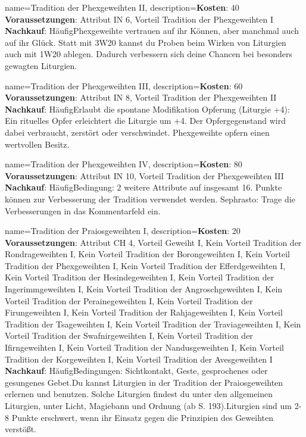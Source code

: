 {
    name={Tradition der Phexgeweihten II},
    description={\textbf{Kosten}: 40 \textbf{Voraussetzungen}: Attribut IN 6, Vorteil Tradition der Phexgeweihten I \textbf{Nachkauf}: Häufig\newline Phexgeweihte vertrauen auf ihr Können, aber manchmal auch auf ihr Glück. Statt mit 3W20 kannst du Proben beim Wirken von Liturgien auch mit 1W20 ablegen. Dadurch verbessern sich deine Chancen bei besonders gewagten Liturgien.}
}


{
    name={Tradition der Phexgeweihten III},
    description={\textbf{Kosten}: 60 \textbf{Voraussetzungen}: Attribut IN 8, Vorteil Tradition der Phexgeweihten II \textbf{Nachkauf}: Häufig\newline Erlaubt die spontane Modifikation Opferung (Liturgie +4): Ein rituelles Opfer erleichtert die Liturgie um +4. Der Opfergegenstand wird dabei verbraucht, zerstört oder verschwindet. Phexgeweihte opfern einen wertvollen Besitz.}
}


{
    name={Tradition der Phexgeweihten IV},
    description={\textbf{Kosten}: 80 \textbf{Voraussetzungen}: Attribut IN 10, Vorteil Tradition der Phexgeweihten III \textbf{Nachkauf}: Häufig\newline Bedingung: 2 weitere Attribute auf insgesamt 16. Punkte können zur Verbesserung der Tradition verwendet werden. Sephrasto: Trage die Verbesserungen in das Kommentarfeld ein.}
}


{
    name={Tradition der Praiosgeweihten I},
    description={\textbf{Kosten}: 20 \textbf{Voraussetzungen}: Attribut CH 4, Vorteil Geweiht I, Kein Vorteil Tradition der Rondrageweihten I, Kein Vorteil Tradition der Borongeweihten I, Kein Vorteil Tradition der Phexgeweihten I, Kein Vorteil Tradition der Efferdgeweihten I, Kein Vorteil Tradition der Hesindegeweihten I, Kein Vorteil Tradition der Ingerimmgeweihten I, Kein Vorteil Tradition der Angroschgeweihten I, Kein Vorteil Tradition der Perainegeweihten I, Kein Vorteil Tradition der Firungeweihten I, Kein Vorteil Tradition der Rahjageweihten I, Kein Vorteil Tradition der Tsageweihten I, Kein Vorteil Tradition der Traviageweihten I, Kein Vorteil Tradition der Swafnirgeweihten I, Kein Vorteil Tradition der Ifirngeweihten I, Kein Vorteil Tradition der Nandusgeweihten I, Kein Vorteil Tradition der Korgeweihten I, Kein Vorteil Tradition der Avesgeweihten I \textbf{Nachkauf}: Häufig\newline Bedingungen: Sichtkontakt, Geste, gesprochenes oder gesungenes Gebet.\newline Du kannst Liturgien in der Tradition der Praiosgeweihten erlernen und benutzen. Solche Liturgien findest du unter den allgemeinen Liturgien, unter Licht, Magiebann und Ordnung (ab S. 193).\newline Liturgien sind um 2-8 Punkte erschwert, wenn ihr Einsatz gegen die Prinzipien des Geweihten verstößt.}
}


